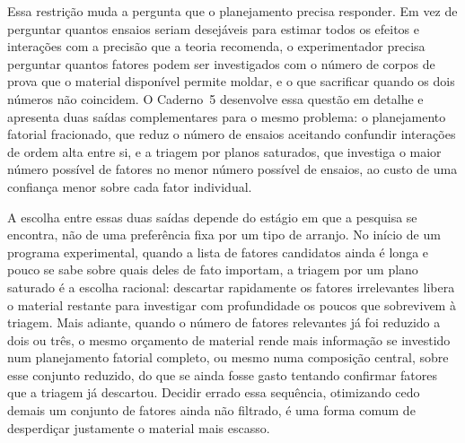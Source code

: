\documentclass{doeapostila}
\begin{document}
Essa restrição muda a pergunta que o planejamento precisa responder. Em vez
de perguntar quantos ensaios seriam desejáveis para estimar todos os
efeitos e interações com a precisão que a teoria recomenda, o
experimentador precisa perguntar quantos fatores podem ser investigados com
o número de corpos de prova que o material disponível permite moldar, e o
que sacrificar quando os dois números não coincidem. O Caderno~5 desenvolve
essa questão em detalhe e apresenta duas saídas complementares para o
mesmo problema: o planejamento fatorial fracionado, que reduz o número de
ensaios aceitando confundir interações de ordem alta entre si, e a
triagem por planos saturados, que investiga o maior número possível de
fatores no menor número possível de ensaios, ao custo de uma confiança
menor sobre cada fator individual.

A escolha entre essas duas saídas depende do estágio em que a pesquisa se
encontra, não de uma preferência fixa por um tipo de arranjo. No início de
um programa experimental, quando a lista de fatores candidatos ainda é
longa e pouco se sabe sobre quais deles de fato importam, a triagem por um
plano saturado é a escolha racional: descartar rapidamente os fatores
irrelevantes libera o material restante para investigar com profundidade
os poucos que sobrevivem à triagem. Mais adiante, quando o número de
fatores relevantes já foi reduzido a dois ou três, o mesmo orçamento de
material rende mais informação se investido num planejamento fatorial
completo, ou mesmo numa composição central, sobre esse conjunto reduzido,
do que se ainda fosse gasto tentando confirmar fatores que a triagem já
descartou. Decidir errado essa sequência, otimizando cedo demais um
conjunto de fatores ainda não filtrado, é uma forma comum de desperdiçar
justamente o material mais escasso.
\end{document}
